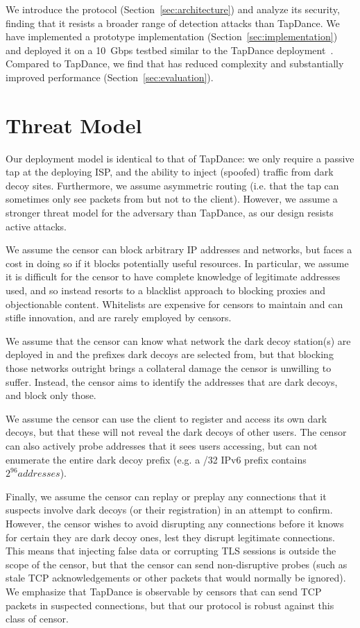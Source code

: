 \documentclass[letterpaper,twocolumn,10pt]{article}
\begin{document}

We introduce the \scheme protocol (Section~\ref{sec:architecture})
and analyze its security, finding that it resists a broader
range of detection attacks than TapDance.
We have implemented a prototype implementation (Section~\ref{sec:implementation})
and deployed it on a 10~Gbps testbed similar to the TapDance
deployment~\cite{frolov2017isp}.  Compared to TapDance, we find that
\scheme has reduced complexity and substantially improved performance
(Section~\ref{sec:evaluation}).




\section{Threat Model}


Our deployment model is identical to that of TapDance: we only require a passive
tap at the deploying ISP, and the ability to inject (spoofed) traffic from dark
decoy sites.
Furthermore, we assume
asymmetric routing (i.e. that the tap can sometimes only see packets from but not to the
client).
However, we assume a stronger threat model for the adversary than
TapDance, as our design resists active attacks.


We assume the censor can block arbitrary IP addresses and networks, but faces a
cost in doing so if it blocks potentially useful resources. In particular, we
assume it is difficult for the censor to have complete knowledge of legitimate
addresses used, and so instead resorts to a blacklist approach to blocking
proxies and objectionable content.
Whitelists are expensive for censors to maintain and can stifle
innovation, and are rarely employed by censors.


We assume that the censor can know what network the dark decoy station(s) are
deployed in and the prefixes dark decoys are selected from, but that blocking those
networks outright brings a collateral
damage the censor is unwilling to suffer. Instead, the censor aims to identify
the addresses that are dark decoys, and block only those.

We assume the censor can use the client to register and access its own dark
decoys, but that these will not reveal the dark decoys of other users. The
censor can also actively probe addresses that it sees users accessing, but can
not enumerate the entire dark decoy prefix (e.g. a /32 IPv6 prefix contains
$2^{96} addresses$).

Finally, we assume the censor can replay or preplay any connections that it
suspects involve dark decoys (or their registration) in an attempt to confirm.
However, the censor wishes to avoid disrupting any connections before it
knows for certain they are dark decoy ones, lest they disrupt legitimate
connections. This means that injecting false data or corrupting TLS sessions is
outside the scope of the censor, but that the censor can send non-disruptive
probes (such as stale TCP acknowledgements or other packets that would normally
be ignored). We emphasize that TapDance is observable by censors that can send
TCP packets in suspected connections, but that our protocol is robust against
this class of censor.
\end{document}

